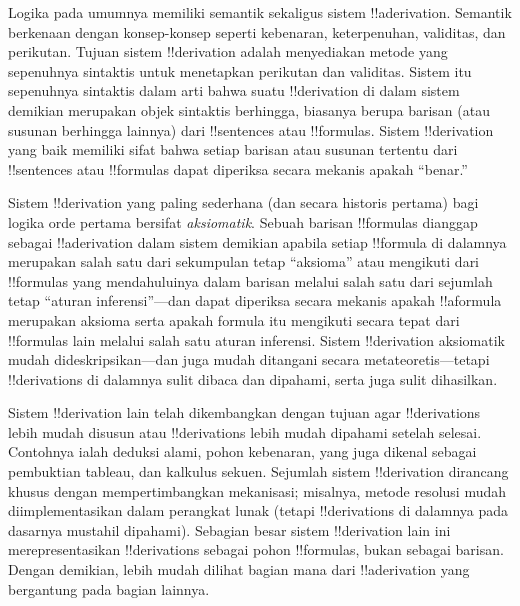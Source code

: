 \documentclass[../../../include/open-logic-section]{subfiles}
\begin{document}
      {}
      {}


Logika pada umumnya memiliki semantik sekaligus sistem !!a{derivation}.
Semantik berkenaan dengan konsep-konsep seperti kebenaran,
keterpenuhan, validitas, dan perikutan. Tujuan sistem !!{derivation}
adalah menyediakan metode yang sepenuhnya sintaktis untuk menetapkan
perikutan dan validitas. Sistem itu sepenuhnya sintaktis dalam arti
bahwa suatu !!{derivation} di dalam sistem demikian merupakan objek
sintaktis berhingga, biasanya berupa barisan (atau susunan berhingga
lainnya) dari !!{sentence}s atau !!{formula}s. Sistem !!{derivation}
yang baik memiliki sifat bahwa setiap barisan atau susunan tertentu
dari !!{sentence}s atau !!{formula}s dapat diperiksa secara mekanis
apakah ``benar.''

Sistem !!{derivation} yang paling sederhana (dan secara historis
pertama) bagi logika orde pertama bersifat \emph{aksiomatik}. Sebuah
barisan !!{formula}s dianggap sebagai !!a{derivation} dalam sistem
demikian apabila setiap !!{formula} di dalamnya merupakan salah satu
dari sekumpulan tetap ``aksioma'' atau mengikuti dari !!{formula}s
yang mendahuluinya dalam barisan melalui salah satu dari sejumlah
tetap ``aturan inferensi''---dan dapat diperiksa secara mekanis apakah
!!a{formula} merupakan aksioma serta apakah formula itu mengikuti
secara tepat dari !!{formula}s lain melalui salah satu aturan
inferensi. Sistem !!{derivation} aksiomatik mudah dideskripsikan---dan
juga mudah ditangani secara metateoretis---tetapi !!{derivation}s di
dalamnya sulit dibaca dan dipahami, serta juga sulit dihasilkan.

Sistem !!{derivation} lain telah dikembangkan dengan tujuan agar
!!{derivation}s lebih mudah disusun atau !!{derivation}s lebih mudah
dipahami setelah
selesai. Contohnya ialah deduksi alami, pohon kebenaran, yang juga
dikenal sebagai pembuktian tableau, dan kalkulus sekuen. Sejumlah
sistem !!{derivation} dirancang khusus dengan mempertimbangkan
mekanisasi; misalnya, metode resolusi mudah diimplementasikan dalam
perangkat lunak (tetapi !!{derivation}s di dalamnya pada dasarnya mustahil
dipahami). Sebagian besar sistem !!{derivation} lain ini
merepresentasikan !!{derivation}s sebagai pohon !!{formula}s, bukan
sebagai barisan. Dengan demikian, lebih mudah dilihat bagian mana dari
!!a{derivation} yang bergantung pada bagian lainnya.
\end{document}
